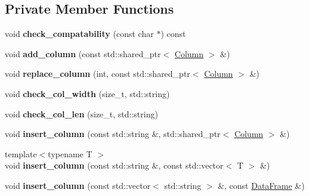 \subsection*{Private Member Functions}
\begin{DoxyCompactItemize}
\item 
\mbox{\label{classDataFrame_1_1DataFrameProxy_ae3bf29a6c9548e39647f186edb68ccc7}} 
void {\bfseries check\+\_\+compatability} (const char $\ast$) const
\item 
\mbox{\label{classDataFrame_1_1DataFrameProxy_a86f0a67b671260df875dd32d587d02c0}} 
void {\bfseries add\+\_\+column} (const std\+::shared\+\_\+ptr$<$ \hyperlink{classColumn}{Column} $>$ \&)
\item 
\mbox{\label{classDataFrame_1_1DataFrameProxy_a0706f91d14181e989b3d41836a8b5cc6}} 
void {\bfseries replace\+\_\+column} (int, const std\+::shared\+\_\+ptr$<$ \hyperlink{classColumn}{Column} $>$ \&)
\item 
\mbox{\label{classDataFrame_1_1DataFrameProxy_a93ea7598d298b57ba7c3226e72dfd42d}} 
void {\bfseries check\+\_\+col\+\_\+width} (size\+\_\+t, std\+::string)
\item 
\mbox{\label{classDataFrame_1_1DataFrameProxy_ae5a106a7251245dd7d0320172a775d43}} 
void {\bfseries check\+\_\+col\+\_\+len} (size\+\_\+t, std\+::string)
\item 
\mbox{\label{classDataFrame_1_1DataFrameProxy_a8cf3701f97648ea7762f524496c21e6b}} 
void {\bfseries insert\+\_\+column} (const std\+::string \&, std\+::shared\+\_\+ptr$<$ \hyperlink{classColumn}{Column} $>$ \&)
\item 
\mbox{\label{classDataFrame_1_1DataFrameProxy_accc578b4911e2b9744616dc3623e4b02}} 
{\footnotesize template$<$typename T $>$ }\\void {\bfseries insert\+\_\+column} (const std\+::string \&, const std\+::vector$<$ T $>$ \&)
\item 
\mbox{\label{classDataFrame_1_1DataFrameProxy_a3af6f64b9454ff50735b0bdbb6f6398b}} 
void {\bfseries insert\+\_\+column} (const std\+::vector$<$ std\+::string $>$ \&, const \hyperlink{classDataFrame}{Data\+Frame} \&)
\end{DoxyCompactItemize}
